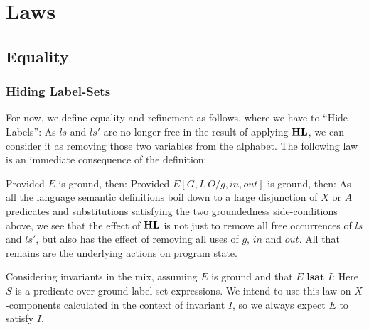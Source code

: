 \section{Laws}\label{sec:laws}


\subsection{Equality}\label{ssec:equality}

\subsubsection{Hiding Label-Sets}\label{sssec:HL}

For now, we define equality and refinement as follows,
where we have to ``Hide Labels'':
As $ls$ and $ls'$ are no longer free in the result of applying $\mathbf{HL}$,
we can consider it as removing those two variables from the alphabet.
The following law is an immediate consequence of the definition:

Provided $E$ is ground, then:
Provided $E[G,I,O/g,in,out]$ is ground, then:
As all the language semantic definitions boil down to a large
disjunction of $X$ or $A$ predicates and substitutions satisfying
the two groundedness side-conditions above,
we see that the effect of $\mathbf{HL}$ is not just to remove
all free occurrences of $ls$ and $ls'$,
but also has the effect of removing all uses of $g$, $in$ and $out$.
All that remains are the underlying actions on program state.

Considering invariants in the mix, assuming $E$ is ground
and that $E \textbf{ lsat } I$:
Here $S$ is a predicate over ground label-set expressions.
We intend to use this law on $X$-components calculated in the
context of invariant $I$, so we always expect $E$ to satisfy $I$.

